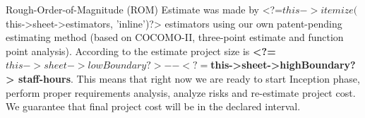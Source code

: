 Rough-Order-of-Magnitude (ROM) Estimate was made by 
<?=$this->itemize($this->sheet->estimators, 'inline')?>
estimators using our own patent-pending estimating method (based on COCOMO-II, 
three-point estimate and function point analysis). According to the estimate
project size is
\textbf{<?=$this->sheet->lowBoundary?>--<?=$this->sheet->highBoundary?> staff-hours}. 
This means that right now we are ready to start Inception phase, perform proper requirements
analysis, analyze risks and re-estimate project cost. We guarantee that final project
cost will be in the declared interval.
